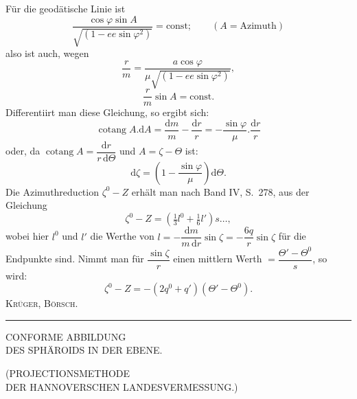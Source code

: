 Für die geodätische Linie ist
\[
\frac{\cos\varphi\sin A}{\sqrt{(1-ee\sin\varphi^2)}}=\text{const};\qquad(A=\text{Azimuth})
\]
also ist auch, wegen
\[
\frac rm=\frac{a\cos\varphi}{\mu\sqrt{(1-ee\sin\varphi^2)}},
\]
\[
\frac rm\sin A=\text{const.}
\]
Differentiirt man diese Gleichung, so ergibt sich:
\[
\operatorname{cotang}A.\mathrm dA=\frac{\mathrm dm}{m}-\frac{\mathrm dr}{r}=-\frac{\sin\varphi}{\mu}.\frac{\mathrm dr}{r}
\]
oder, da $\operatorname{cotang}A=\dfrac{\mathrm dr}{r\,\mathrm d\Theta}$ und $A=\zeta-\Theta$ ist:
\[
\mathrm d\zeta=\left(1-\frac{\sin\varphi}{\mu}\right)\mathrm d\Theta.
\]
Die Azimuthreduction $\zeta^0-Z$ erhält man nach Band IV, S.~278, aus der Gleichung
\[
\zeta^0-Z=(\tfrac13l^0+\tfrac16l')s\ldots,
\]
wobei hier $l^0$ und $l'$ die Werthe von $l=-\dfrac{\mathrm dm}{m\,\mathrm dr}\sin\zeta=-\dfrac{6q}{r}\sin\zeta$ für die Endpunkte sind. Nimmt man für $\dfrac{\sin\zeta}{r}$ einen mittlern Werth $=\dfrac{\Theta'-\Theta^0}{s}$, so wird:
\[
\zeta^0-Z=-(2q^0+q')(\Theta'-\Theta^0).
\]
\hfill\textsc{Krüger, Börsch.}\par
\par\endgroup
\vfill\begin{center}\rule{.24\textwidth}{.4pt}\end{center}
\clearpage
\null\vfill
\begin{center}
{\LARGE CONFORME ABBILDUNG\\[8pt]DES SPHÄROIDS IN DER EBENE.}\par\bigskip
{\Large (PROJECTIONSMETHODE\\DER HANNOVERSCHEN LANDESVERMESSUNG.)}
\end{center}
\vfill\null
\endgroup
